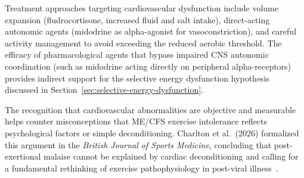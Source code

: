 Treatment approaches targeting cardiovascular dysfunction include volume expansion (fludrocortisone, increased fluid and salt intake), direct-acting autonomic agents (midodrine as alpha-agonist for vasoconstriction), and careful activity management to avoid exceeding the reduced aerobic threshold. The efficacy of pharmacological agents that bypass impaired CNS autonomic coordination (such as midodrine acting directly on peripheral alpha-receptors) provides indirect support for the selective energy dysfunction hypothesis discussed in Section~\ref{sec:selective-energy-dysfunction}.

The recognition that cardiovascular abnormalities are objective and measurable helps counter misconceptions that ME/CFS exercise intolerance reflects psychological factors or simple deconditioning. Charlton et al.\ (2026) formalized this argument in the \textit{British Journal of Sports Medicine}, concluding that post-exertional malaise cannot be explained by cardiac deconditioning and calling for a fundamental rethinking of exercise pathophysiology in post-viral illness~\cite{Charlton2026pem}.

